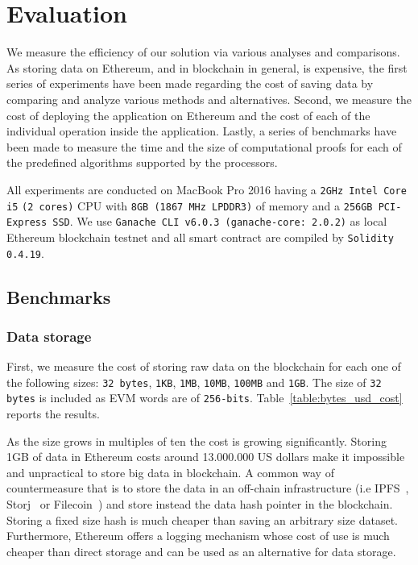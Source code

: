 \chapter{Evaluation}
\label{evaluation}

We measure the efficiency of our solution via various analyses and comparisons. As storing data on Ethereum, and in blockchain in general, is expensive, the first series of experiments have been made regarding the cost of saving data by comparing and analyze various methods and alternatives. Second, we measure the cost of deploying the application on Ethereum and the cost of each of the individual operation inside the application. Lastly, a series of benchmarks have been made to measure the time and the size of computational proofs for each of the predefined algorithms supported by the processors.

All experiments are conducted on MacBook Pro 2016 having a \verb|2GHz Intel Core i5| \verb|(2 cores)| CPU with \verb|8GB (1867 MHz LPDDR3)| of memory and a \verb|256GB PCI-Express SSD|. We use \verb|Ganache CLI v6.0.3 (ganache-core: 2.0.2)| as local Ethereum blockchain testnet and all smart contract are compiled by \verb|Solidity 0.4.19|.

\section{Benchmarks}
\label{evaluation:benchmarks}

\subsection{Data storage}
\label{evaluation:data_storage}

First, we measure the cost of storing raw data on the blockchain for each one of the following sizes: \verb|32 bytes|, \verb|1KB|, \verb|1MB|, \verb|10MB|, \verb|100MB| and \verb|1GB|. The size of \verb|32 bytes| is included as EVM words are of \verb|256-bits|. Table~\ref{table:bytes_usd_cost} reports the results.

As the size grows in multiples of ten the cost is growing significantly. Storing 1GB of data in Ethereum costs around 13.000.000 US dollars make it impossible and unpractical to store big data in blockchain. A common way of countermeasure that is to store the data in an off-chain infrastructure (i.e IPFS~\cite{ipfs}, Storj~\cite{storj} or Filecoin~\cite{filecoin}) and store instead the data hash pointer in the blockchain. Storing a fixed size hash is much cheaper than saving an arbitrary size dataset. Furthermore, Ethereum offers a logging mechanism whose cost of use is much cheaper than direct storage and can be used as an alternative for data storage.

